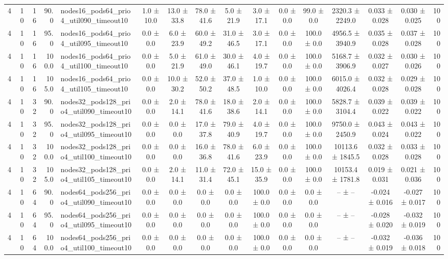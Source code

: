 \begin{tabular}{r r r r l c c c c c c c c c c r}
4 & 10 & 16 & 90.0 & nodes16\_pods64\_prio4\_util090\_timeout10 & 1.0 ± 10.0 & 13.0 ± 33.8 & 78.0 ± 41.6 & 5.0 ± 21.9 & 3.0 ± 17.1 & 0.0 ± 0.0 & 99.0 ± 0.0 & 2320.3 ± 2249.0 & 0.033 ± 0.028 & 0.030 ± 0.025 & 100 \\
4 & 10 & 16 & 95.0 & nodes16\_pods64\_prio4\_util095\_timeout10 & 0.0 ± 0.0 & 6.0 ± 23.9 & 60.0 ± 49.2 & 31.0 ± 46.5 & 3.0 ± 17.1 & 0.0 ± 0.0 & 100.0 ± 0.0 & 4956.5 ± 3940.9 & 0.035 ± 0.028 & 0.037 ± 0.028 & 100 \\
4 & 10 & 16 & 100.0 & nodes16\_pods64\_prio4\_util100\_timeout10 & 0.0 ± 0.0 & 5.0 ± 21.9 & 61.0 ± 49.0 & 30.0 ± 46.1 & 4.0 ± 19.7 & 0.0 ± 0.0 & 100.0 ± 0.0 & 5168.7 ± 3906.9 & 0.032 ± 0.027 & 0.030 ± 0.026 & 100 \\
4 & 10 & 16 & 105.0 & nodes16\_pods64\_prio4\_util105\_timeout10 & 0.0 ± 0.0 & 10.0 ± 30.2 & 52.0 ± 50.2 & 37.0 ± 48.5 & 1.0 ± 10.0 & 0.0 ± 0.0 & 100.0 ± 0.0 & 6015.0 ± 4026.4 & 0.032 ± 0.028 & 0.029 ± 0.028 & 100 \\
4 & 10 & 32 & 90.0 & nodes32\_pods128\_prio4\_util090\_timeout10 & 0.0 ± 0.0 & 2.0 ± 14.1 & 78.0 ± 41.6 & 18.0 ± 38.6 & 2.0 ± 14.1 & 0.0 ± 0.0 & 100.0 ± 0.0 & 5828.7 ± 3104.4 & 0.039 ± 0.022 & 0.039 ± 0.022 & 100 \\
4 & 10 & 32 & 95.0 & nodes32\_pods128\_prio4\_util095\_timeout10 & 0.0 ± 0.0 & 0.0 ± 0.0 & 17.0 ± 37.8 & 79.0 ± 40.9 & 4.0 ± 19.7 & 0.0 ± 0.0 & 100.0 ± 0.0 & 9750.0 ± 2450.9 & 0.043 ± 0.024 & 0.043 ± 0.022 & 100 \\
4 & 10 & 32 & 100.0 & nodes32\_pods128\_prio4\_util100\_timeout10 & 0.0 ± 0.0 & 0.0 ± 0.0 & 16.0 ± 36.8 & 78.0 ± 41.6 & 6.0 ± 23.9 & 0.0 ± 0.0 & 100.0 ± 0.0 & 10113.6 ± 1845.5 & 0.032 ± 0.028 & 0.033 ± 0.028 & 100 \\
4 & 10 & 32 & 105.0 & nodes32\_pods128\_prio4\_util105\_timeout10 & 0.0 ± 0.0 & 2.0 ± 14.1 & 11.0 ± 31.4 & 72.0 ± 45.1 & 15.0 ± 35.9 & 0.0 ± 0.0 & 100.0 ± 0.0 & 10153.4 ± 1781.8 & 0.019 ± 0.031 & 0.021 ± 0.036 & 100 \\
4 & 10 & 64 & 90.0 & nodes64\_pods256\_prio4\_util090\_timeout10 & 0.0 ± 0.0 & 0.0 ± 0.0 & 0.0 ± 0.0 & 0.0 ± 0.0 & 100.0 ± 0.0 & 0.0 ± 0.0 & 0.0 ± 0.0 & -- ± -- & -0.024 ± 0.016 & -0.027 ± 0.017 & 100 \\
4 & 10 & 64 & 95.0 & nodes64\_pods256\_prio4\_util095\_timeout10 & 0.0 ± 0.0 & 0.0 ± 0.0 & 0.0 ± 0.0 & 0.0 ± 0.0 & 100.0 ± 0.0 & 0.0 ± 0.0 & 0.0 ± 0.0 & -- ± -- & -0.028 ± 0.020 & -0.032 ± 0.019 & 100 \\
4 & 10 & 64 & 100.0 & nodes64\_pods256\_prio4\_util100\_timeout10 & 0.0 ± 0.0 & 0.0 ± 0.0 & 0.0 ± 0.0 & 0.0 ± 0.0 & 100.0 ± 0.0 & 0.0 ± 0.0 & 0.0 ± 0.0 & -- ± -- & -0.032 ± 0.019 & -0.036 ± 0.018 & 100 \\

\end{tabular}
